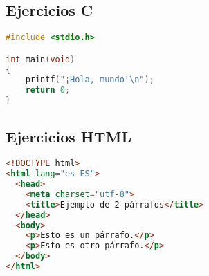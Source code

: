 \subsection{Ejercicios C}
\begin{lstlisting}[language=c]
#include <stdio.h>

int main(void)
{
    printf("¡Hola, mundo!\n");
    return 0;
}
\end{lstlisting}

\subsection{Ejercicios HTML}

\begin{lstlisting}[language=html]
<!DOCTYPE html>
<html lang="es-ES">
  <head>
    <meta charset="utf-8">
    <title>Ejemplo de 2 párrafos</title>
  </head>
  <body>
    <p>Esto es un párrafo.</p>
    <p>Esto es otro párrafo.</p>
  </body>
</html>
\end{lstlisting}

